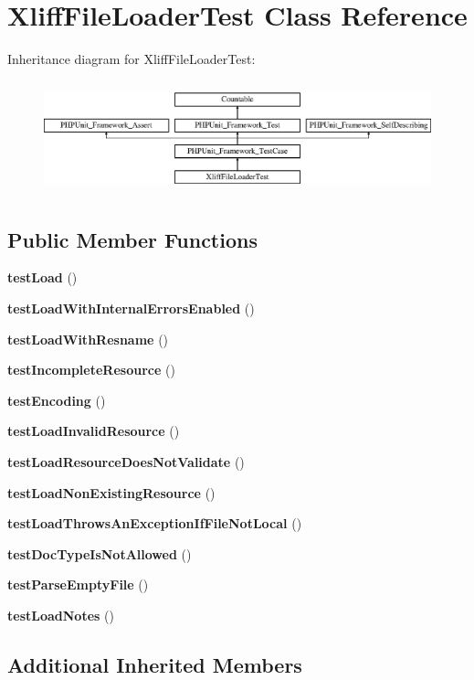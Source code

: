 \section{Xliff\+File\+Loader\+Test Class Reference}
\label{class_symfony_1_1_component_1_1_translation_1_1_tests_1_1_loader_1_1_xliff_file_loader_test}
Inheritance diagram for Xliff\+File\+Loader\+Test\+:\begin{figure}[H]
\begin{center}
\leavevmode
\includegraphics[height=3.303835cm]{class_symfony_1_1_component_1_1_translation_1_1_tests_1_1_loader_1_1_xliff_file_loader_test}
\end{center}
\end{figure}
\subsection*{Public Member Functions}
\begin{DoxyCompactItemize}
\item 
{\bf test\+Load} ()
\item 
{\bf test\+Load\+With\+Internal\+Errors\+Enabled} ()
\item 
{\bf test\+Load\+With\+Resname} ()
\item 
{\bf test\+Incomplete\+Resource} ()
\item 
{\bf test\+Encoding} ()
\item 
{\bf test\+Load\+Invalid\+Resource} ()
\item 
{\bf test\+Load\+Resource\+Does\+Not\+Validate} ()
\item 
{\bf test\+Load\+Non\+Existing\+Resource} ()
\item 
{\bf test\+Load\+Throws\+An\+Exception\+If\+File\+Not\+Local} ()
\item 
{\bf test\+Doc\+Type\+Is\+Not\+Allowed} ()
\item 
{\bf test\+Parse\+Empty\+File} ()
\item 
{\bf test\+Load\+Notes} ()
\end{DoxyCompactItemize}
\subsection*{Additional Inherited Members}


